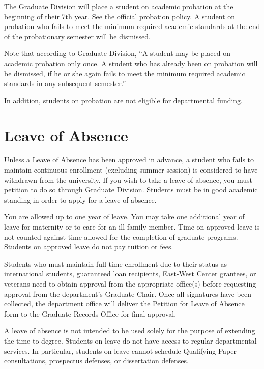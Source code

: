 \documentclass[
]{book}
\begin{document}
The Graduate Division will place a student on academic probation at the beginning of their 7th year. See the official \href{http://manoa.hawaii.edu/graduate/content/disciplinary-actions}{probation policy}. A student on probation who fails to meet the minimum required academic standards at the end of the probationary semester will be dismissed.

Note that according to Graduate Division, ``A student may be placed on academic probation only once. A student who has already been on probation will be dismissed, if he or she again fails to meet the minimum required academic standards in any subsequent semester.''

In addition, students on probation are not eligible for departmental funding.

\section{Leave of Absence}\label{leave-of-absence}

Unless a Leave of Absence has been approved in advance, a student who fails to maintain continuous enrollment (excluding summer session) is considered to have withdrawn from the university. If you wish to take a leave of absence, you must \href{https://manoa.hawaii.edu/graduate/leave-of-absence/}{petition to do so through Graduate Division}. Students must be in good academic standing in order to apply for a leave of absence.

You are allowed up to one year of leave. You may take one additional year of leave for maternity or to care for an ill family member. Time on approved leave is not counted against time allowed for the completion of graduate programs. Students on approved leave do not pay tuition or fees.

Students who must maintain full-time enrollment due to their status as international students, guaranteed loan recipients, East-West Center grantees, or veterans need to obtain approval from the appropriate office(s) before requesting approval from the department's Graduate Chair. Once all signatures have been collected, the department office will deliver the Petition for Leave of Absence form to the Graduate Records Office for final approval.

A leave of absence is not intended to be used solely for the purpose of extending the time to degree. Students on leave do not have access to regular departmental services. In particular, students on leave cannot schedule Qualifying Paper consultations, prospectus defenses, or dissertation defenses.
\end{document}
